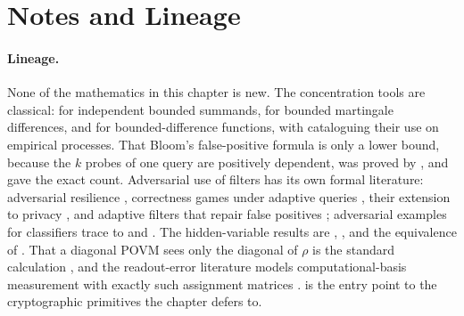 %

\section{Notes and Lineage}
\label{sec:bib-notes-ch16}

\paragraph{Lineage.}
None of the mathematics in this chapter is new. The concentration tools are
classical: \textcite{hoeffding-1963} for independent bounded summands,
\textcite{azuma-1967} for bounded martingale differences, and
\textcite{mcdiarmid-1989} for bounded-difference functions, with
\textcite{devroye-lugosi-2001} cataloguing their use on empirical
processes. That Bloom's false-positive formula is only a lower bound,
because the $k$ probes of one query are positively dependent, was proved
by \textcite{bose-et-al-2008}, and \textcite{christensen-roginsky-jimeno-2010}
gave the exact count. Adversarial use of filters has its own formal
literature: adversarial resilience \parencite{naor-yogev-2015},
correctness games under adaptive queries
\parencite{clayton-patton-shrimpton-2019}, their extension to privacy
\parencite{filic-et-al-2022}, and adaptive filters that repair false
positives \parencite{bender-et-al-2018}; adversarial examples for
classifiers trace to \textcite{goodfellow-2015} and
\textcite{carlini-wagner-2017}. The hidden-variable results are
\textcite{bell-1964}, \textcite{kochen-specker-1967}, and the equivalence
of \textcite{fine-1982}. That a diagonal POVM sees only the diagonal of
$\rho$ is the standard calculation \parencite{nielsen-chuang-2010}, and
the readout-error literature models computational-basis measurement with
exactly such assignment matrices
\parencite{bravyi-et-al-2021,nation-et-al-2021,smith-et-al-2021}.
\textcite{goldreich-1996} is the entry point to the cryptographic
primitives the chapter defers to.

